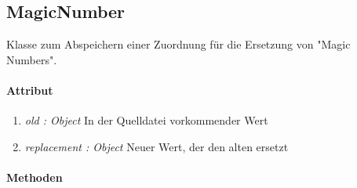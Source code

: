 \subsection{MagicNumber}
Klasse zum Abspeichern einer Zuordnung für die Ersetzung von \string"Magic Numbers\string".

\paragraph{Attribut}
\begin{enumerate}[-]
\item \textit{old : Object} In der Quelldatei vorkommender Wert
\item \textit{replacement : Object} Neuer Wert, der den alten ersetzt
\end{enumerate}
\paragraph{Methoden}